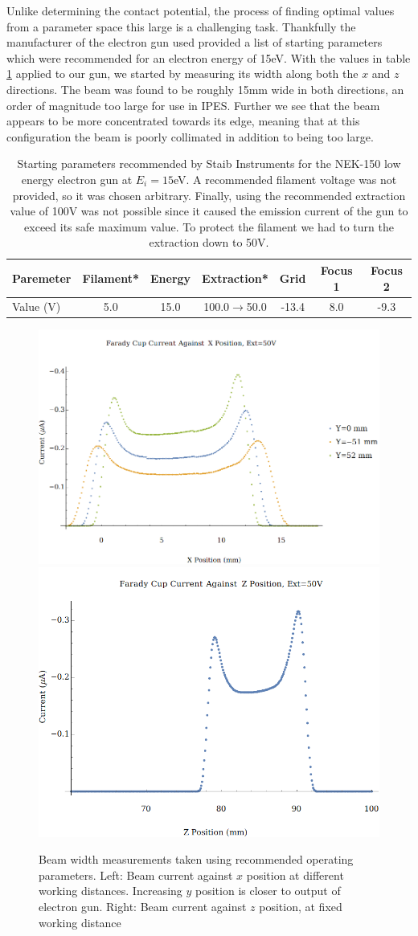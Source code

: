 Unlike determining the contact potential, the process of finding optimal values from a parameter space this large is a challenging task. Thankfully the manufacturer of the electron gun used provided a list of starting parameters
which were recommended for an electron energy of 15eV. With the values in table \ref{tab:recpar} applied to our gun, we started by measuring its width along both the $x$ and 
$z$ directions. The beam was found to be roughly 15mm wide in both directions, an order of magnitude too large for use in IPES. Further we see that the beam appears to be more 
concentrated towards its edge, meaning that at this configuration the beam is poorly collimated in addition to being too large. 

\begin{table}[h!]
	\centering
	\begin{tabular}{ccccccc}
		\hline
		\multicolumn{1}{l|}{Paremeter} & Filament* & Energy & Extraction* & Grid & Focus 1 & Focus 2 \\ \hline
		\multicolumn{1}{l|}{Value (V)} & 5.0 & 15.0 & 100.0$\rightarrow$50.0 & -13.4 & 8.0 & -9.3 \\ \hline
	\end{tabular}
	\caption{Starting parameters recommended by Staib Instruments for the NEK-150 low energy electron gun at $E_i=15$eV. A recommended filament 
	voltage was not provided, so it was chosen arbitrary. Finally, using the recommended extraction value of 100V was not possible since it caused 
	the emission current of the gun to exceed its safe maximum value. To protect the filament we had to turn the extraction down to 50V.}
	\label{tab:recpar}
\end{table}

\begin{figure}[h!]
    \centering
    \includegraphics[width=0.45\linewidth]{../Test Scans/GunResPlots/BeamWidthXVaryingYExt50.png}
	\includegraphics[width=0.45\linewidth]{../Test Scans/GunResPlots/BeamWidthZExt50.png}
	\caption{Beam width measurements taken using recommended operating parameters. Left: Beam current against $x$ position at different working distances. Increasing $y$ position is closer to output of electron gun. 
	Right: Beam current against $z$ position, at fixed working distance}
    \label{fig:badbeam}
\end{figure}

